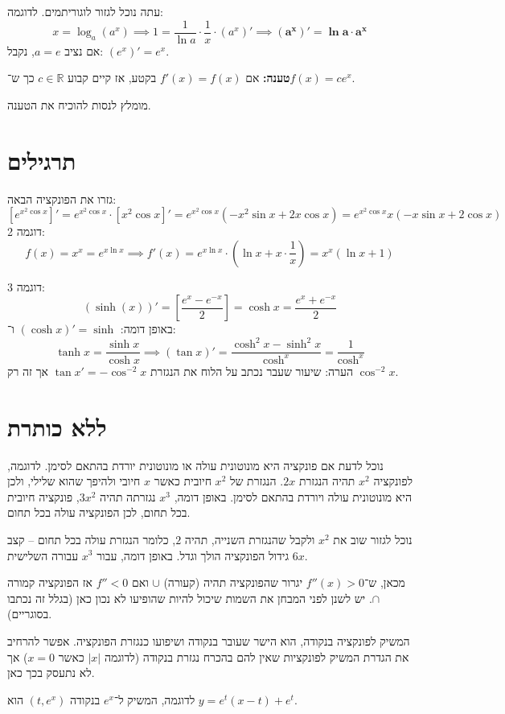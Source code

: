 \documentclass[]{article}
\newcommand\R     {\mathbb{R}}
\newcommand\cosx  {\cos x}
\newcommand\sinx  {\sin x}
\newcommand\tanx  {\tan x}
\begin{document}
	עתה נוכל לגזור לוגוריתמים. לדוגמה: 
	\[ x = \log_a(a^{x}) \implies 1 = \frac{1}{\ln a} \cdot \frac{1}{x} \cdot (a^{x})' \implies \bm{(a^{x})' = \ln a \cdot a^{x}} \]
	אם נציב $a = e$, נקבל: $(e^{x})' = e^{x}$. 
	
	\textbf{טענה: }אם $f'(x) = f(x)$ בקטע, אז קיים קבוע $c \in \R$ כך ש־$f(x) = ce^{x}$. 
	
	מומלץ לנסות להוכיח את הטענה. 
	
	\section{תרגילים}
	גזרו את הפונקציה הבאה: 
	\[ [e^{x^2\cosx}]' =e^{x^2\cosx} \cdot [x^2 \cosx]' = e^{x^2\cosx}(-x^2\sinx + 2x\cosx) = e^{x^2\cosx}x(-x\sinx + 2\cosx) \]
	דוגמה 2: 
	\[ f(x) = x^{x} = e^{x \ln x} \implies f'(x) = e^{x \ln x} \cdot (\ln x + x \cdot \frac{1}{x}) = x^{x}(\ln x + 1) \]
	
	דוגמה 3: 
	\[ (\sinh(x))' = \left [\frac{e^{x} - e^{-x}}{2}\right ] = \cosh x = \frac{e^x+ e^{-x}}{2} \]
	באופן דומה: $ (\cosh x)' = \sinh $ ו־: 
	\[ \tanh x = \frac{\sinh x}{\cosh x} \implies (\tan x)' = \frac{\cosh^2 x - \sinh^2x}{\cosh^x} = \frac{1}{\cosh^x} \]
	הערה: שיעור שעבר נכתב על הלוח את הנגזרת $\tanx' = -\cos^{-2}x$ אך זה רק $\cos^{-2}x$. 
	
	\section{ללא כותרת}
	נוכל לדעת אם פונקציה היא מונוטונית עולה או מונוטונית יורדת בהתאם לסימן. לדוגמה, לפונקציה $x^2$ תהיה הנגזרת $2x$. הנגזרת של $x^2$ חיובית כאשר $x$ חיובי ולהיפך שהוא שלילי, ולכן היא מונוטונית עולה ויורדת בהתאם לסימן. באופן דומה, $x^3$ נגזרתה תהיה $3x^2$, פונקציה חיובית בכל תחום, לכן הפונקציה עולה בכל תחום. 
	
	נוכל לגזור שוב את $x^2$ ולקבל שהנגזרת השנייה, תהיה $2$, כלומר הנגזרת עולה בכל תחום – קצב גידול הפונקציה הולך וגדל. באופן דומה, עבור $x^3$ עבורה השלישית $6x$. 
	
	מכאן, ש־$f''(x) > 0$ יגרור שהפונקציה תהיה (קעורה) $\cup$ ואם $f''<0 $ אז הפונקציה קמורה $\cap$. יש לשנן לפני המבחן את השמות שיכול להיות שהופיעו לא נכון כאן (בגלל זה נכתבו בסוגריים). 
	
	המשיק לפונקציה בנקודה, הוא הישר שעובר בנקודה ושיפועו כנגזרת הפונקציה. אפשר להרחיב את הגדרת המשיק לפונקציות שאין להם בהכרח נגזרת בנקודה (לדוגמה $|x|$ כאשר $x = 0$) אך לא נתעסק בכך כאן. 
	
	לדוגמה, המשיק ל־$e^x$ בנקודה $(t, e^{x})$ הוא $y =  e^{t}(x - t) + e^{t}$. 
	
\end{document}
